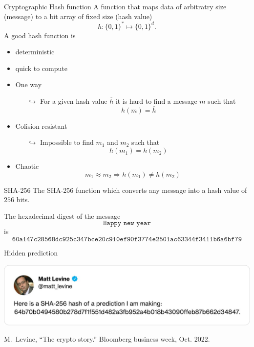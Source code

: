 \documentclass{beamer}
\begin{document}
\begin{frame}{Cryptographic Hash function}
\small
A function that maps data of arbitratry size (message) to a bit array of fixed size (hash value)
$$
h:\{0,1\}^\ast\mapsto \{0,1\}^d. 
$$
A good hash function is
\begin{itemize}
\item deterministic
\item quick to compute
\item One way
\begin{itemize}
  \scriptsize
\item[$\hookrightarrow$] For a given hash value $\overline{h}$ it is hard to find a message $m$ such that 
$$
h(m) = \overline{h}
$$
\end{itemize}
\item Colision resistant 
\begin{itemize}
\item[$\hookrightarrow$] Impossible to find $m_1$ and $m_2$ such that 
$$
h(m_1) = h(m_2)
$$
\end{itemize}
\item Chaotic
$$m_1\approx m_2\Rightarrow  h(m_1) \neq h(m_2)$$
\end{itemize}
\end{frame}
\begin{frame}{SHA-256}
The SHA-256 function which converts any message into a hash value of $256$ bits.
\begin{tcolorbox}[enhanced,drop shadow, title=Example]
The hexadecimal digest of the message
$$
\texttt{Happy new year}
$$
is 
\footnotesize
$$
\texttt{60a147c28568dc925c347bce20c910ef90f3774e2501ac63344f3411b6a6bf79}
$$
\end{tcolorbox}
\end{frame}
\begin{frame}{Hidden prediction}
\begin{center}
 \includegraphics[width= \textwidth]{../../Figures/levine_twitter}
\end{center}
\footnotesize{
\begin{thebibliography}{1}
M.~Levine, ``The crypto story.'' Bloomberg business week, Oct. 2022.\\
\end{thebibliography}  
}




\end{frame}
\end{document}
